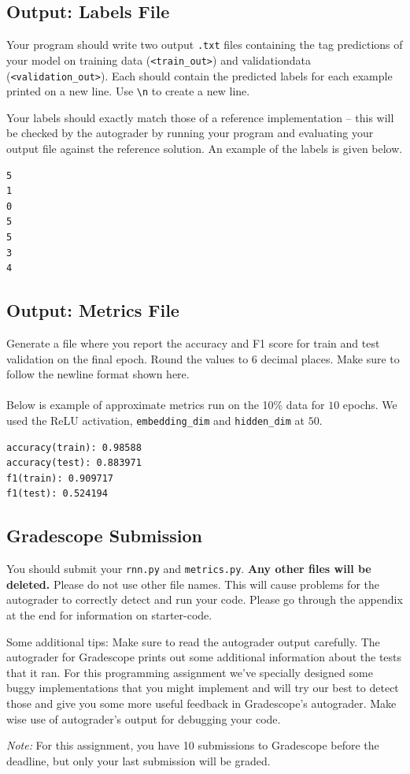 \documentclass[11pt,addpoints,answers]{exam}
\begin{document}
\subsection{Output: Labels File} \label{output}
Your program should write two output \texttt{.txt} files containing the tag predictions of your model on training data (\texttt{<train\_out>}) and validation\thinspace data (\texttt{<validation\_out>}). Each should contain the predicted labels for each example printed on a new line. Use \lstinline{\n} to create a new line. 

Your labels should exactly match those of a reference implementation -- this will be checked by the autograder by running your program and evaluating your output file against the reference solution. An example of the labels is given below.
\begin{lstlisting}
5
1
0
5
5
3
4
\end{lstlisting}

\subsection{Output: Metrics File} \label{metrics}
Generate a file where you report the accuracy and F1 score for train and test validation on the final epoch. Round the values to 6 decimal places. Make sure to follow the newline format shown here. \\ \\
Below is  example of approximate metrics run on the 10\% data for $10$ epochs. We used the ReLU activation, \texttt{embedding\_dim} and \texttt{hidden\_dim} at $50$.
\begin{lstlisting}
accuracy(train): 0.98588
accuracy(test): 0.883971
f1(train): 0.909717
f1(test): 0.524194
\end{lstlisting}

\subsection{Gradescope Submission}

You should submit your \texttt{rnn.py} and \texttt{metrics.py}. \textbf{Any other files will be deleted.} Please do not use other file names. This will cause problems for the autograder to correctly detect and run your code. Please go through the appendix at the end for information on starter-code.

Some additional tips: 
Make sure to read the autograder output carefully. The autograder for Gradescope prints out some additional 
information about the tests that it ran. For this programming assignment we’ve specially designed some buggy implementations that you might implement and will try our best to detect those and give you some more useful feedback in Gradescope’s autograder. Make wise use of autograder’s output for debugging your code.


\textit{Note:} For this assignment, you have 10 submissions to Gradescope before the deadline, but only your last submission will be graded.
\end{document}
